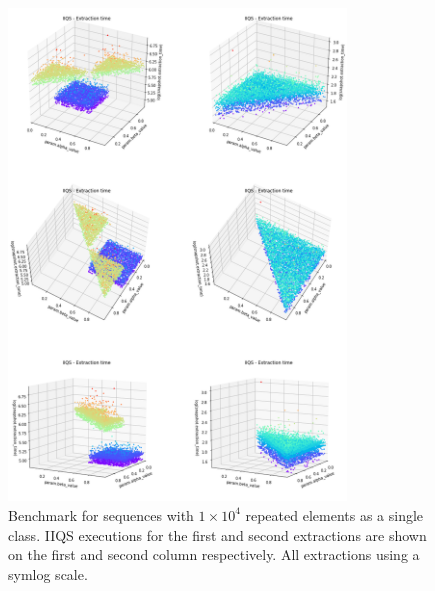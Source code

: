 \begin{figure}[!ht]
    \centering
    \includegraphics[width=0.8\textwidth]{./fragments/04_experimental_execution/images/04_alphabeta_singleclass.png}
    \caption{Benchmark for sequences with $1\times10^4$ repeated elements as a single class. IIQS executions for the first and second extractions are shown on the first and second column respectively. All extractions using a symlog scale.}
    \label{FIG:05_ALPHABETA_RELATIONSHIP_SINGLECLASS}
\end{figure}



